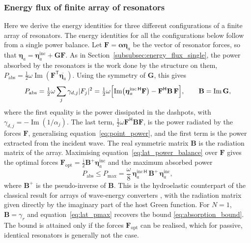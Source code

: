 \subsubsection{Energy flux of finite array of resonators}
Here we derive the energy identities for three different configurations of a finite array of resonators. The energy identities for all the configurations below follow from a single power balance. Let $\mathbf{F}=\boldsymbol{\alpha}\boldsymbol{\eta}_a$ be the vector of resonator forces, so that $\boldsymbol{\eta}_a=\boldsymbol{\eta}_a^{\mathrm{inc}}+\mathbf{G}\mathbf{F}$. As in Section~\ref{subsubsec:energy_flux_single}, the power absorbed by the resonators is the work done by the structure on them, $P_{\mathrm{abs}}=\tfrac12\omega\operatorname{Im}(\mathbf{F}^{\mathsf{T}}\overline{\boldsymbol{\eta}_a})$. Using the symmetry of $\mathbf{G}$, this gives
\begin{equation}\label{eq:lat_power_balance}
    P_{\mathrm{abs}}
    =\tfrac12\omega\sum_j\gamma_{d,j}|F_j|^2
    =\tfrac12\omega\Bigl[\operatorname{Im}\bigl(\boldsymbol{\eta}_a^{\mathrm{inc}\,\mathsf{H}}\mathbf{F}\bigr)-\mathbf{F}^{\mathsf{H}}\mathbf{B}\,\mathbf{F}\Bigr],
    \qquad
    \mathbf{B}=\operatorname{Im}\mathbf{G},
\end{equation}
where the first equality is the power dissipated in the dashpots, with $\gamma_{d,j}=-\operatorname{Im}(1/\alpha_j)$. The last term, $\tfrac12\omega\mathbf{F}^{\mathsf{H}}\mathbf{B}\mathbf{F}$, is the power radiated by the forces $\mathbf{F}$, generalising equation~\eqref{eq:point_power}, and the first term is the power extracted from the incident wave. The real symmetric matrix $\mathbf{B}$ is the radiation matrix of the array. Maximising equation~\eqref{eq:lat_power_balance} over $\mathbf{F}$ gives the optimal forces $\mathbf{F}_{\mathrm{opt}}=\tfrac{\mathrm{i}}{2}\mathbf{B}^{+}\boldsymbol{\eta}_a^{\mathrm{inc}}$ and the maximum absorbed power
\begin{equation}\label{eq:lat_pmax}
    P_{\mathrm{abs}}\le P_{\max}=\frac{\omega}{8}\,\boldsymbol{\eta}_a^{\mathrm{inc}\,\mathsf{H}}\,\mathbf{B}^{+}\,\boldsymbol{\eta}_a^{\mathrm{inc}},
\end{equation}
where $\mathbf{B}^{+}$ is the pseudo-inverse of $\mathbf{B}$. This is the hydroelastic counterpart of the classical result for arrays of wave-energy converters \citep{falnes1980radiation}, with the radiation matrix given directly by the imaginary part of the host Green function. For $N=1$, $\mathbf{B}=\gamma_r$ and equation~\eqref{eq:lat_pmax} recovers the bound \eqref{eq:absorption_bound}. The bound is attained only if the forces $\mathbf{F}_{\mathrm{opt}}$ can be realised, which for passive, identical resonators is generally not the case.

